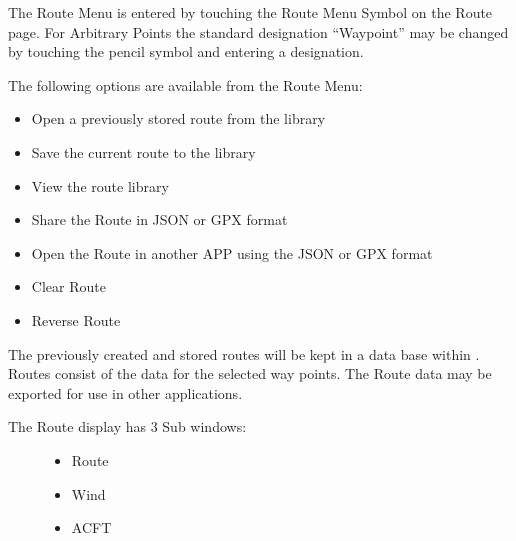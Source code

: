 \documentclass[letterpaper,10pt,english]{sphinxmanual}
\begin{document}
\sphinxAtStartPar
The Route Menu is entered by touching the Route Menu Symbol on the Route page.
For Arbitrary Points the standard designation “Waypoint” may be changed by touching the pencil symbol and entering a designation.

\sphinxAtStartPar
The following options are available from the Route Menu:
\begin{itemize}
\item {} 
\sphinxAtStartPar
Open a previously stored route from the library

\item {} 
\sphinxAtStartPar
Save the current route to the library

\item {} 
\sphinxAtStartPar
View the route library

\item {} 
\sphinxAtStartPar
Share the Route in JSON or GPX format

\item {} 
\sphinxAtStartPar
Open the Route in another APP using the JSON or GPX format

\item {} 
\sphinxAtStartPar
Clear Route

\item {} 
\sphinxAtStartPar
Reverse Route

\end{itemize}

\sphinxAtStartPar
The previously created and stored routes will be kept in a data base within
. Routes consist of the data for the selected way
points. The Route data may be exported for use in other applications.
\begin{description}
\item[{The Route display has 3 Sub windows:}] \leavevmode\begin{itemize}
\item {} 
\sphinxAtStartPar
Route

\item {} 
\sphinxAtStartPar
Wind

\item {} 
\sphinxAtStartPar
ACFT

\end{itemize}

\end{description}

\begin{figure}[htbp]
\centering

\noindent{}
\end{figure}
\end{document}
